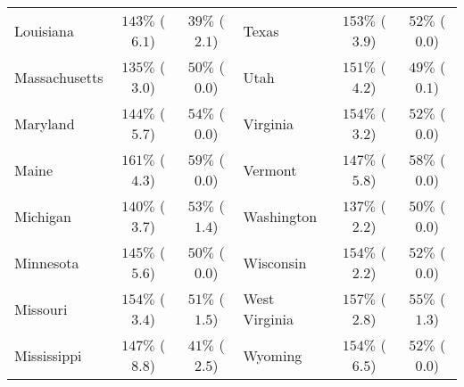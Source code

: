 \begin{tabular}{lcclcc}
Louisiana & $143\%$ ($6.1$)  & $39\%$ ($2.1$)  & Texas & $153\%$ ($3.9$)  & $52\%$ ($0.0$)  \\ 
Massachusetts & $135\%$ ($3.0$)  & $50\%$ ($0.0$)  & Utah & $151\%$ ($4.2$)  & $49\%$ ($0.1$)  \\ 
Maryland & $144\%$ ($5.7$)  & $54\%$ ($0.0$)  & Virginia & $154\%$ ($3.2$)  & $52\%$ ($0.0$)  \\ 
Maine & $161\%$ ($4.3$)  & $59\%$ ($0.0$)  & Vermont & $147\%$ ($5.8$)  & $58\%$ ($0.0$)  \\ 
Michigan & $140\%$ ($3.7$)  & $53\%$ ($1.4$)  & Washington & $137\%$ ($2.2$)  & $50\%$ ($0.0$)  \\ 
Minnesota & $145\%$ ($5.6$)  & $50\%$ ($0.0$)  & Wisconsin & $154\%$ ($2.2$)  & $52\%$ ($0.0$)  \\ 
Missouri & $154\%$ ($3.4$)  & $51\%$ ($1.5$)  & West Virginia & $157\%$ ($2.8$)  & $55\%$ ($1.3$)  \\ 
Mississippi & $147\%$ ($8.8$)  & $41\%$ ($2.5$)  & Wyoming & $154\%$ ($6.5$)  & $52\%$ ($0.0$)  \\ 
\bottomrule
\end{tabular}

